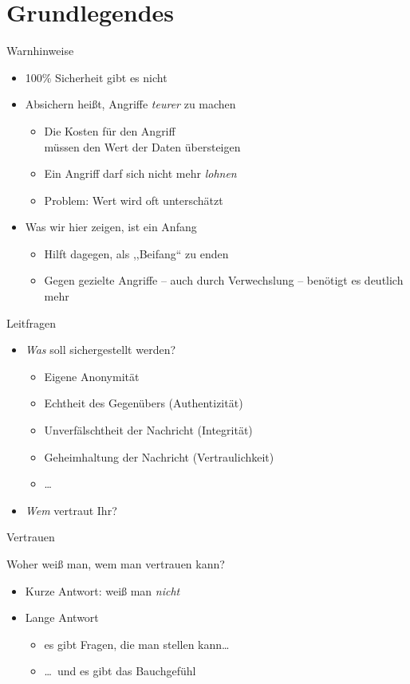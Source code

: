 \section{Grundlegendes}
\begin{frame}{Warnhinweise}
  \begin{itemize}
    \item 100\% Sicherheit gibt es nicht
    \item Absichern heißt, Angriffe \emph{teurer} zu machen
    \begin{itemize}
    \item Die Kosten für den Angriff\\ müssen den Wert der Daten übersteigen
    \item Ein Angriff darf sich nicht mehr \emph{lohnen}
    \item Problem: Wert wird oft unterschätzt
    \end{itemize}
    \item Was wir hier zeigen, ist ein Anfang
    \begin{itemize}
      \item Hilft dagegen, als ,,Beifang`` zu enden
      \item Gegen gezielte Angriffe -- auch durch Verwechslung -- benötigt es deutlich mehr
    \end{itemize}
  \end{itemize}
\end{frame}

\begin{frame}{Leitfragen}
  \begin{itemize}
    \item \emph{Was} soll sichergestellt werden?
      \begin{itemize}
        \item Eigene Anonymität
        \item Echtheit des Gegenübers (Authentizität)
        \item Unverfälschtheit der Nachricht (Integrität)
        \item Geheimhaltung der Nachricht (Vertraulichkeit)
        \item \ldots
      \end{itemize}
    \item \emph{Wem} vertraut Ihr?
  \end{itemize}
\end{frame}

\begin{frame}{Vertrauen}
  \begin{block}{Woher weiß man, wem man vertrauen kann?}
  \begin{itemize}
    \item Kurze Antwort: weiß man \emph{nicht}
    \item Lange Antwort
    \begin{itemize}
      \item es gibt Fragen, die man stellen kann\ldots
      \item \ldots\ und es gibt das Bauchgefühl
    \end{itemize}
  \end{itemize}
  \end{block}
\end{frame}

